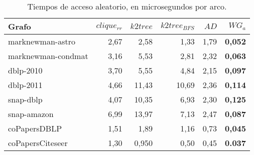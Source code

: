 \begin{table}
	\caption{Tiempos de acceso aleatorio, en microsegundos por arco.}
	\label{table:timesRandom}
	\centering
	\begin{tabular}{l|r|r|r|r|r}
		\toprule
		Grafo & $clique_{rr}$ & $k2tree$ & $k2tree_{BFS}$ & $AD$ & $WG_{a}$ \\
        \midrule    
        marknewman-astro & 2,67 & 2,58 & 1,33 & 1,79 & \textbf{0,052} \\
        marknewman-condmat & 3,16 & 5,53 & 2,81 & 2,32 & \textbf{0,063} \\
        dblp-2010 & 3,70 & 5,55 & 4,84 & 2,15 & \textbf{0,097} \\
        dblp-2011 & 4,66 & 11,43 & 10,69 & 2,36 & \textbf{0,114} \\
        snap-dblp & 4,07 & 10,35 & 6,93 & 2,30 & \textbf{0,125} \\
        snap-amazon & 6,99 & 13,97 & 7,13 & 2,47 & \textbf{0,087} \\
        coPapersDBLP & 1,51 & 1,89 & 1,16 & 0,73 & \textbf{0,045} \\
        coPapersCiteseer & 1,30 & 0,950 & 0,50 & 0,45 & \textbf{0.037} \\
        \bottomrule
	\end{tabular}
\end{table}
